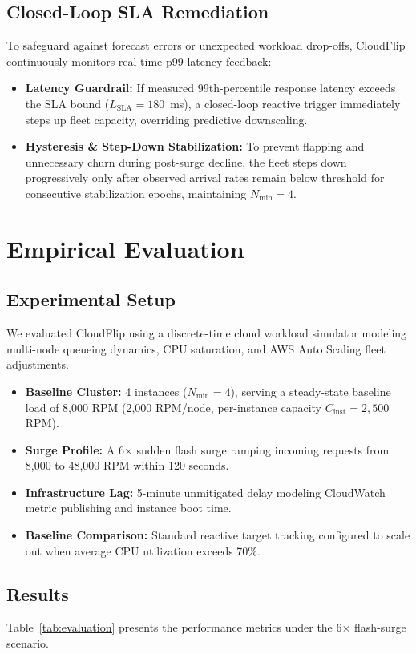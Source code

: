 \documentclass[conference]{IEEEtran}
\begin{document}
\subsection{Closed-Loop SLA Remediation}
To safeguard against forecast errors or unexpected workload drop-offs, CloudFlip continuously monitors real-time p99 latency feedback:
\begin{itemize}
    \item \textbf{Latency Guardrail:} If measured 99th-percentile response latency exceeds the SLA bound ($L_{\text{SLA}} = 180$~ms), a closed-loop reactive trigger immediately steps up fleet capacity, overriding predictive downscaling.
    \item \textbf{Hysteresis & Step-Down Stabilization:} To prevent flapping and unnecessary churn during post-surge decline, the fleet steps down progressively only after observed arrival rates remain below threshold for consecutive stabilization epochs, maintaining $N_{\min} = 4$.
\end{itemize}

\section{Empirical Evaluation}
\subsection{Experimental Setup}
We evaluated CloudFlip using a discrete-time cloud workload simulator modeling multi-node queueing dynamics, CPU saturation, and AWS Auto Scaling fleet adjustments. 
\begin{itemize}
    \item \textbf{Baseline Cluster:} 4 instances ($N_{\min} = 4$), serving a steady-state baseline load of 8,000 RPM (2,000 RPM/node, per-instance capacity $C_{\text{inst}} = 2,500$ RPM).
    \item \textbf{Surge Profile:} A 6$\times$ sudden flash surge ramping incoming requests from 8,000 to 48,000 RPM within 120 seconds.
    \item \textbf{Infrastructure Lag:} 5-minute unmitigated delay modeling CloudWatch metric publishing and instance boot time.
    \item \textbf{Baseline Comparison:} Standard reactive target tracking configured to scale out when average CPU utilization exceeds 70\%.
\end{itemize}

\subsection{Results}
Table~\ref{tab:evaluation} presents the performance metrics under the 6$\times$ flash-surge scenario.
\end{document}
